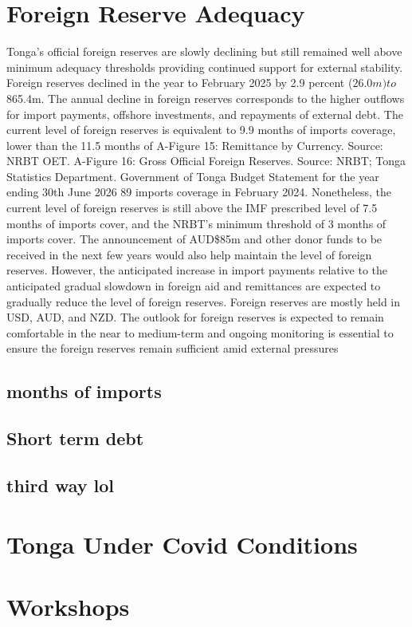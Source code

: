\documentclass[12pt]{article}
\begin{document}
\section{Foreign Reserve Adequacy}
Tonga’s official foreign reserves are slowly 
declining but still remained well above 
minimum adequacy thresholds providing 
continued support for external stability.
Foreign reserves declined in the year to 
February 2025 by 2.9 percent ($26.0 m) to 
$865.4m. The annual decline in foreign 
reserves corresponds to the higher outflows 
for import payments, offshore investments, 
and repayments of external debt. The 
current level of foreign reserves is 
equivalent to 9.9 months of imports 
coverage, lower than the 11.5 months of 
A-Figure 15: Remittance by Currency.
Source: NRBT OET.
A-Figure 16: Gross Official Foreign Reserves.
Source: NRBT; Tonga Statistics Department.
Government of Tonga Budget Statement for the year ending 30th June 2026
89
imports coverage in February 2024. Nonetheless, the current level of foreign reserves is still above the 
IMF prescribed level of 7.5 months of imports cover, and the NRBT’s minimum threshold of 3 months 
of imports cover. 
The announcement of AUD\$85m and other donor funds to be received in the next few years would also 
help maintain the level of foreign reserves. However, the anticipated increase in import payments 
relative to the anticipated gradual slowdown in foreign aid and remittances are expected to gradually 
reduce the level of foreign reserves. Foreign reserves are mostly held in USD, AUD, and NZD. The 
outlook for foreign reserves is expected to remain comfortable in the near to medium-term and ongoing 
monitoring is essential to ensure the foreign reserves remain sufficient amid external pressures
\subsection{months of imports}
\subsection{Short term debt}
\subsection{third way lol}
\section{Tonga Under Covid Conditions}
\section{Workshops}
\end{document}
